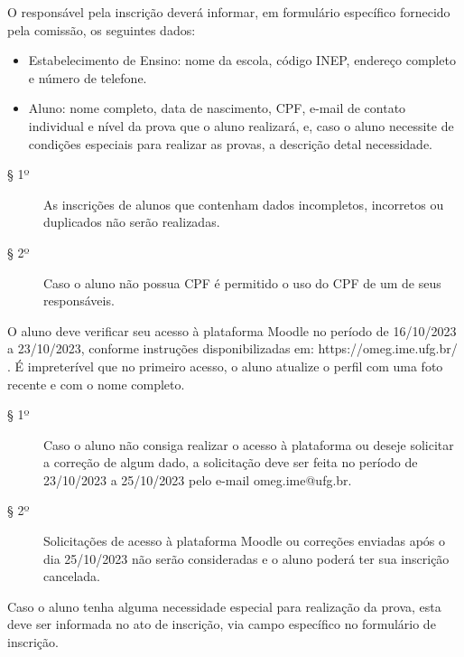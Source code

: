 \begin{article}
  O responsável pela inscrição deverá informar, em formulário específico
  fornecido pela comissão, os seguintes dados:
  \begin{itemize}
    \item
      Estabelecimento de Ensino: nome da escola, código INEP, endereço
      completo e número de telefone.
    \item
      Aluno: nome completo, data de nascimento, CPF, e-mail de contato
      individual e nível da prova que o aluno realizará, e, caso o aluno
      necessite de condições especiais para realizar as provas, a descrição
      detal necessidade.
  \end{itemize}
  \begin{description}
    \item[§ 1º]
      As inscrições de alunos que contenham dados incompletos, incorretos ou
      duplicados não serão realizadas.
    \item[§ 2º]
      Caso o aluno não possua CPF é permitido o uso do CPF de um de seus
      responsáveis.
  \end{description}
\end{article}

\begin{article}
  O aluno deve verificar seu acesso à plataforma Moodle no período de
  16/10/2023 a 23/10/2023, conforme instruções disponibilizadas em:
  https://omeg.ime.ufg.br/ . É impreterível que no primeiro acesso, o aluno
  atualize o perfil com uma foto recente e com o nome completo.
  \begin{description}
    \item[§ 1º]
      Caso o aluno não consiga realizar o acesso à plataforma ou deseje
      solicitar a correção de algum dado, a solicitação deve ser feita no período de
      23/10/2023 a 25/10/2023 pelo e-mail omeg.ime@ufg.br.
    \item[§ 2º]
      Solicitações de acesso à plataforma Moodle ou correções enviadas
      após o dia 25/10/2023 não serão consideradas e o aluno poderá ter sua
      inscrição cancelada.
  \end{description}
\end{article}

\begin{article}
  Caso o aluno tenha alguma necessidade especial para realização da prova,
  esta deve ser informada no ato de inscrição, via campo específico no
  formulário de inscrição.
\end{article}

